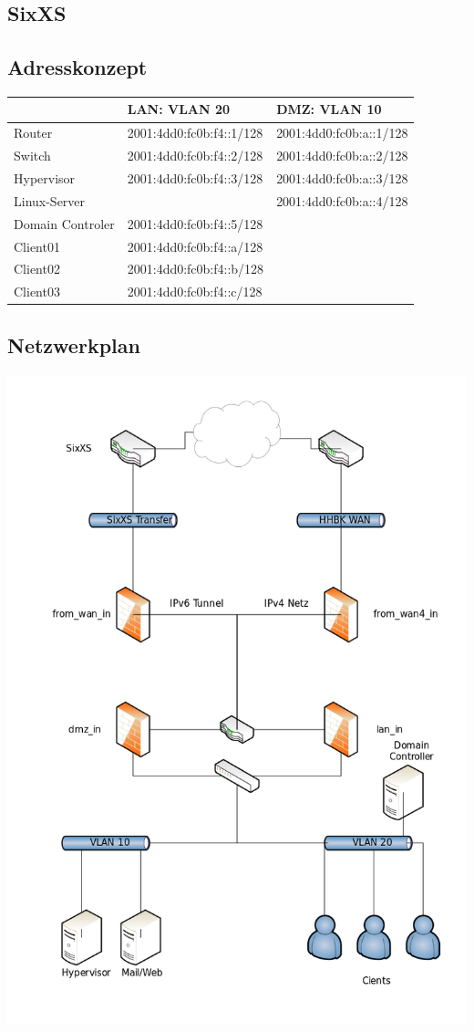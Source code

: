 \subsection{SixXS}

\subsection{Adresskonzept}

\begin{tabular}{|l|l|l|}
\hline
					& LAN: VLAN 20					& DMZ: VLAN 10 \\
\hline
Router				& 2001:4dd0:fc0b:f4::1/128		& 2001:4dd0:fc0b:a::1/128 \\
Switch				& 2001:4dd0:fc0b:f4::2/128		& 2001:4dd0:fc0b:a::2/128 \\
Hypervisor			& 2001:4dd0:fc0b:f4::3/128		& 2001:4dd0:fc0b:a::3/128 \\	
Linux-Server			&								& 2001:4dd0:fc0b:a::4/128 \\
Domain Controler 	& 2001:4dd0:fc0b:f4::5/128		& \\
Client01				& 2001:4dd0:fc0b:f4::a/128		& \\
Client02				& 2001:4dd0:fc0b:f4::b/128		& \\
Client03				& 2001:4dd0:fc0b:f4::c/128		& \\
\hline
\end{tabular}

\subsection{Netzwerkplan}

\includegraphics[scale=0.5]{8gruppe_dokumentation_pictures/02_JahresProjekt_Netzwerkplan.png}
\label{realisiertes_netzwerk}
